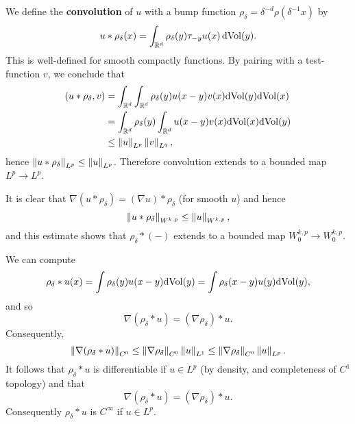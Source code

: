 \documentclass{amsart}
\begin{document}
We define the \textbf{convolution} of $u$ with a bump function $\rho_{\delta}=\delta^{-d}\rho(\delta^{-1} x)$ by
\begin{equation*}
  u\ast\rho_{\delta}(x)=\int_{\mathbb{R}^{d}} \rho_{\delta}(y)\tau_{-y}u(x)\,\mathrm{dVol}(y).
\end{equation*}
This is well-defined for smooth compactly functions. By pairing with a test-function $v$, we conclude that
\begin{equation*}
  \begin{aligned}
    (u\ast\rho_{\delta},v)&=\int_{\mathbb{R}^{d}} \int_{\mathbb{R}^{d}} \rho_{\delta}(y)u(x-y)v(x)\mathrm{d}\mathrm{Vol}(y)\mathrm{d}\mathrm{Vol}(x)\\
    &=\int_{\mathbb{R}^{d}}\rho_{\delta}(y)\int_{\mathbb{R}^{d}}u(x-y)v(x)\mathrm{d}\mathrm{Vol}(x)\mathrm{d}\mathrm{Vol}(y)\\
    &\le \left\lVert u\right\rVert_{L^{p}}\left\lVert v\right\rVert_{L^{q}},
  \end{aligned}
\end{equation*}
hence $\left\lVert u\ast\rho_{\delta}\right\rVert_{L^{p}}\le \left\lVert u\right\rVert_{L^{p}}$. Therefore convolution extends to a bounded map $L^{p}\to L^{p}$.

It is clear that $\nabla(u\ast\rho_{\delta})=(\nabla u)\ast\rho_{\delta}$ (for smooth $u$) and hence 
\begin{equation*}
  \left\lVert u\ast\rho_{\delta}\right\rVert_{W^{k,p}}\le \left\lVert u\right\rVert_{W^{k,p}},
\end{equation*}
and this estimate shows that $\rho_{\delta}\ast(-)$ extends to a bounded map $W^{k,p}_{0}\to W^{k,p}_{0}$.

We can compute
\begin{equation*}
  \rho_{\delta}\ast u(x)=\int \rho_{\delta}(y)u(x-y)\mathrm{d}\mathrm{Vol}(y)=\int \rho_{\delta}(x-y)u(y)\mathrm{dVol}(y),
\end{equation*}
and so
\begin{equation*}
  \nabla (\rho_{\delta}\ast u)=(\nabla \rho_{\delta})\ast u.
\end{equation*}
Consequently,
\begin{equation*}
  \left\lVert\nabla (\rho_{\delta}\ast u)\right\rVert_{C^{0}}\le \left\lVert\nabla \rho_{\delta}\right\rVert_{C^{0}}\left\lVert u\right\rVert_{L^{1}}\le \left\lVert\nabla \rho_{\delta}\right\rVert_{C^{0}}\left\lVert u\right\rVert_{L^{p}}.
\end{equation*}
It follows that $\rho_{\delta}\ast u$ is differentiable if $u\in L^{p}$ (by density, and completeness of $C^{1}$ topology) and that
\begin{equation*}
  \nabla(\rho_{\delta}\ast u)=(\nabla \rho_{\delta})\ast u. 
\end{equation*}
Consequently $\rho_{\delta}\ast u$ is $C^{\infty}$ if $u\in L^{p}$.
\end{document}
